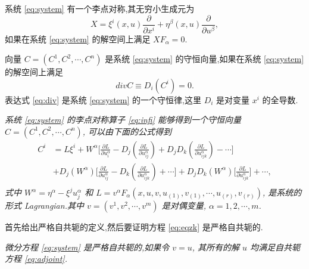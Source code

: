 系统 \eqref{eq:system} 有一个李点对称,其无穷小生成元为
\begin{equation}\label{eq:infi}
X=\xi^i(x,u)\frac{\partial}{\partial x^i}+\eta^\beta(x,u)\frac{\partial}{\partial u^\beta},
\end{equation}
如果在系统 \eqref{eq:system} 的解空间上满足 $XF_\alpha=0$.

向量 $C=(C^1,C^2,\cdots,C^n)$ 是系统 \eqref{eq:system} 的守恒向量,如果在系统 \eqref{eq:system} 的解空间上满足
\begin{equation}\label{eq:div}
divC\equiv D_i(C^i)=0.
\end{equation}
表达式 \eqref{eq:div} 是系统 \eqref{eq:system} 的一个守恒律,这里 $D_i$ 是对变量 $x^i$ 的全导数.

\begin{theorem}
\emph{系统 \eqref{eq:system} 的李点对称算子 \eqref{eq:infi} 能够得到一个守恒向量 $C=(C^1,C^2,\cdots,C^n)$, 可以由下面的公式得到
\begin{equation*}
\begin{aligned}
C^i&=L\xi^i+W^\alpha \bigg[\frac{\partial L}{\partial u^\alpha_i}-D_j(\frac{\partial L}{\partial u^\alpha_{ij}})+D_jD_k(\frac{\partial L}{\partial u^\alpha_{ijk}})-\cdots\bigg]\\
&+D_j(W^\alpha)\bigg[\frac{\partial L}{\partial u^\alpha_{ij}}-D_k(\frac{\partial L}{\partial u^\alpha_{ijk}})+\cdots\bigg]+D_jD_k(W^\alpha)\bigg[\frac{\partial L}{\partial u^\alpha_{ijk}}\bigg]+\cdots,\\
\end{aligned}
\end{equation*}
式中 $W^\alpha=\eta^\alpha-\xi^ju^\alpha_j$ 和 $L=v^\alpha F_\alpha(x,u,v,u_{(1)},v_{(1)},\cdots,u_{(r)},v_{(r)})$, 是系统的形式 Lagrangian.其中 $v= (v^1,v^2,\cdots,v^m)$ 是对偶变量, $\alpha=1,2,\cdots, m$.}
\end{theorem}

首先给出严格自共轭的定义,然后要证明方程 \eqref{eq:eqzk} 是严格自共轭的.

\begin{definition}[严格自共轭]
	\emph{微分方程 \eqref{eq:system} 是严格自共轭的,如果令 $v=u$, 其所有的解 $u$ 均满足自共轭方程 \eqref{eq:adjoint}.}
\end{definition}

%

